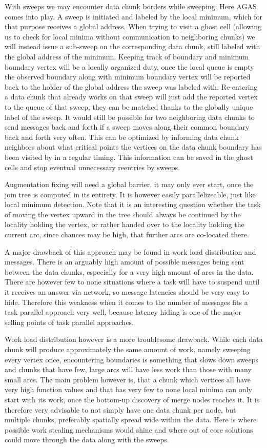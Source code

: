 \documentclass{scrartcl}
\begin{document}
With sweeps we may encounter data chunk borders while sweeping. Here AGAS comes into play. A sweep is initiated and labeled by the local minimum, which for that purpose receives a global address. When trying to visit a ghost cell (allowing us to check for local minima without communication to neighboring chunks) we will instead issue a sub-sweep on the corresponding data chunk, still labeled with the global address of the minimum. Keeping track of boundary and minimum boundary vertex will be a locally organized duty, once the local queue is empty the observed boundary along with minimum boundary vertex will be reported back to the holder of the global address the sweep was labeled with. Re-entering a data chunk that already works on that sweep will just add the reported vertex to the queue of that sweep, they can be matched thanks to the globally unique label of the sweep. It would still be possible for two neighboring data chunks to send messages back and forth if a sweep moves along their common boundary back and forth very often. This can be optimized by informing data chunk neighbors about what critical points the vertices on the data chunk boundary has been visited by in a regular timing. This information can be saved in the ghost cells and stop eventual unnecessary reentries by sweeps.

Augmentation fixing will need a global barrier, it may only ever start, once the join tree is computed in its entirety. It is however easily parallelizeable, just like local minimum detection. Note that it is an interesting question whether the task of moving the vertex upward in the tree should always be continued by the locality holding the vertex, or rather handed over to the locality holding the current arc, since chances may be high, that further arcs are co-located there. 

A major drawback of this approach may be found in work load distribution and messages. There is an arguably high amount of possible messages being sent between the data chunks, especially for a very high amount of arcs in the data. There are however few to none situations where a task will have to suspend until it receives an answer via network, so message latencies should be very easy to hide. Therefore this weakness when it comes to the number of messages fits a task parallel approach very well, because latency hiding is one of the major selling points of task parallel approaches.

Work load distribution however is a more troublesome drawback. While each data chunk will produce approximately the same amount of work, namely sweeping every vertex once, encountering boundaries is something that slows down sweeps and chunks that have few, large arcs will have less work than those with many small arcs. The main problem however is, that a chunk which vertices all have very high function values and that has very few to none local minima can only start with its work, once the bottom-up discovery of merge nodes reaches it. It is therefore very advisable to not simply have one data chunk per node, but multiple chunks, preferably spatially spread wide within the data. Here is where possible work stealing mechanisms would shine and where out of core solutions could move through the data along with the sweeps.  
\end{document}
